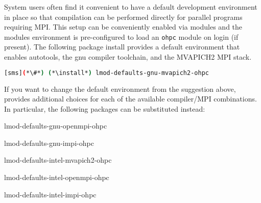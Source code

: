 System users often find it convenient to have a default development environment
in place so that compilation can be performed directly for parallel programs
requiring MPI. This setup can be conveniently enabled via modules and the \OHPC{}
modules environment is pre-configured to load an \texttt{ohpc} module on login
(if present). The following package install provides a default
environment that enables autotools, the gnu compiler toolchain, and the
MVAPICH2 MPI stack.

\begin{lstlisting}[language=bash]
[sms](*\#*) (*\install*) lmod-defaults-gnu-mvapich2-ohpc
\end{lstlisting}

\begin{center}
\begin{tcolorbox}[]
\small
If you want to change the default environment from the suggestion above, \OHPC{}
provides additional choices for each of the available compiler/MPI
combinations. In particular, the following packages can be substituted instead:
\begin{multicols}{2}
\begin{itemize*}
\item lmod-defaults-gnu-openmpi-ohpc
\item lmod-defaults-gnu-impi-ohpc
\item lmod-defaults-intel-mvapich2-ohpc
\item lmod-defaults-intel-openmpi-ohpc
\item lmod-defaults-intel-impi-ohpc
\end{itemize*}
\end{multicols}
\end{tcolorbox}
\end{center}
